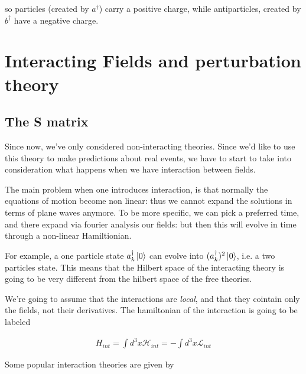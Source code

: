 \documentclass{report}
\begin{document}
so particles (created by \(a^\dagger\)) carry a positive charge, while antiparticles, created by \(b^\dagger\) have a negative charge. 



\chapter{Interacting Fields and perturbation theory}

\section{The S matrix}

Since now, we've only considered non-interacting theories. Since we'd like to use this theory to make predictions about real events, we have to start to take into consideration what happens when we have interaction between fields. 

The main problem when one introduces interaction, is that normally the equations of motion become non linear: thus we cannot expand the solutions in terms of plane waves anymore. To be more specific, we can pick a preferred time, and there expand via fourier analysis our fields: but then this will evolve in time through a non-linear Hamiltionian.

For example, a one particle state \(a^\dagger_k\ket{0}\) can evolve into \((a^\dagger_k)^2\ket{0}\), i.e. a two particles state. This means that the Hilbert space of the interacting theory is going to be very different from the hilbert space of the free theories. 

We're going to assume that the interactions are \emph{local}, and that they cointain only the fields, not their derivatives. The hamiltonian of the interaction is going to be labeled 

\begin{align}
    H_{int} = \int d^3x \mathcal{H}_{int} = -\int d^3x \mathcal{L}_{int}
\end{align}

Some popular interaction theories are given by 
\end{document}
